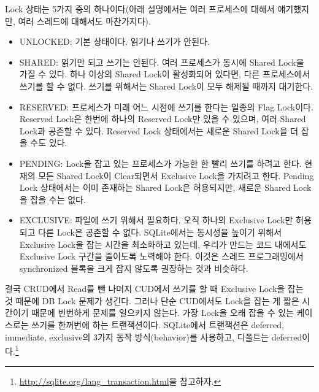 Lock 상태는 5가지 중의 하나이다(아래 설명에서는 여러 프로세스에 대해서 얘기했지만, 여러 스레드에 대해서도 마찬가지다).
\begin{itemize}
\item UNLOCKED: 기본 상태이다. 읽기나 쓰기가 안된다.

\item SHARED: 읽기만 되고 쓰기는 안된다. 여러 프로세스가 동시에 Shared Lock을 가질 수 있다. 하나 이상의 Shared Lock이 활성화되어 있다면, 다른 프로세스에서 쓰기를 할 수 없다. 쓰기를 위해서는 Shared Lock이 모두 해제될 때까지 대기한다.

\item RESERVED: 프로세스가 미래 어느 시점에 쓰기를 한다는 일종의 Flag Lock이다. Reserved Lock은 한번에 하나의 Reserved Lock만 있을 수 있으며, 여러 Shared Lock과 공존할 수 있다. Reserved Lock 상태에서는 새로운 Shared Lock을 더 잡을 수도 있다.

\item PENDING: Lock을 잡고 있는 프로세스가 가능한 한 빨리 쓰기를 하려고 한다. 현재의 모든 Shared Lock이 Clear되면서 Exclusive Lock을 가지려고 한다. Pending Lock 상태에서는 이미 존재하는 Shared Lock은 허용되지만, 새로운 Shared Lock을 잡을 수는 없다.

\item EXCLUSIVE: 파일에 쓰기 위해서 필요하다. 오직 하나의 Exclusive Lock만 허용되고 다른 Lock은 공존할 수 없다. 
SQLite에서는 동시성을 높이기 위해서 Exclusive Lock을 잡는 시간을 최소화하고 있는데, 우리가 만드는 코드 내에서도 Exclusive Lock 구간을 줄이도록 노력해야 한다. 
이것은 스레드 프로그래밍에서 synchronized 블록을 크게 잡지 않도록 권장하는 것과 비슷하다. 
\end{itemize}

결국 CRUD에서 Read를 뺀 나머지 CUD에서 쓰기를 할 때 Exclusive Lock을 잡는 것 때문에 DB Lock 문제가 생긴다. 
그러나 단순 CUD에서도 Lock을 잡는 게 짧은 시간이기 때문에 빈번하게 문제를 일으키지 않는다. 
가장 Lock을 오래 잡을 수 있는 케이스로는 쓰기를 한꺼번에 하는 트랜잭션이다.
SQLite에서 트랜잭션은 deferred, immediate, exclusive의 3가지 동작 방식(behavior)를 사용하고, 디폴트는 deferred이다.\footnote{\url{http://sqlite.org/lang\_transaction.html}을 참고하자.}\\

